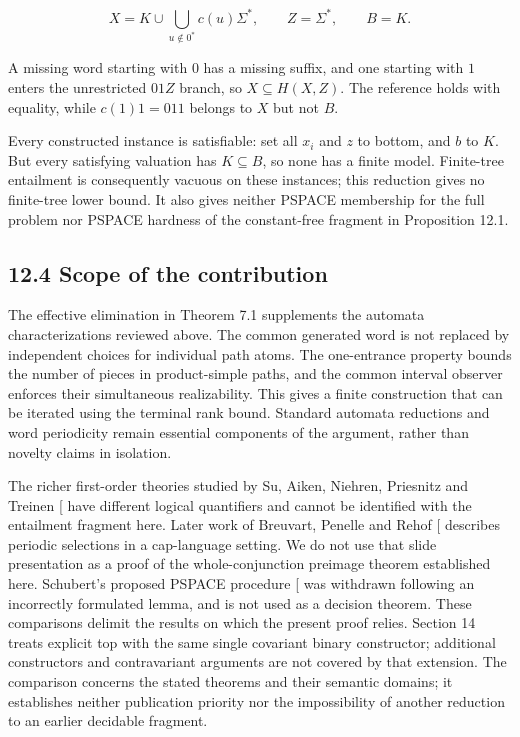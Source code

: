 \documentclass[
  11pt,
  a4paper,
]{article}
\newcounter{none} %
\begin{document}
\[X=K\cup\bigcup_{u\notin0^*}c(u)\Sigma^*,
\qquad Z=\Sigma^*,\qquad B=K.\]

A missing word starting with \(0\) has a missing suffix, and one
starting with \(1\) enters the unrestricted \(01Z\) branch, so
\(X\subseteq H(X,Z)\). The reference holds with equality, while
\(c(1)1=011\) belongs to \(X\) but not \(B\).

Every constructed instance is satisfiable: set all \(x_i\) and \(z\) to
bottom, and \(b\) to \(K\). But every satisfying valuation has
\(K\subseteq B\), so none has a finite model. Finite-tree entailment is
consequently vacuous on these instances; this reduction gives no
finite-tree lower bound. It also gives neither PSPACE membership for the
full problem nor PSPACE hardness of the constant-free fragment in
Proposition 12.1.

\subsection{12.4 Scope of the
contribution}\label{scope-of-the-contribution}

The effective elimination in Theorem 7.1 supplements the automata
characterizations reviewed above. The common generated word is not
replaced by independent choices for individual path atoms. The
one-entrance property bounds the number of pieces in product-simple
paths, and the common interval observer enforces their simultaneous
realizability. This gives a finite construction that can be iterated
using the terminal rank bound. Standard automata reductions and word
periodicity remain essential components of the argument, rather than
novelty claims in isolation.

The richer first-order theories studied by Su, Aiken, Niehren, Priesnitz
and Treinen {[}\citeproc{ref-SANPT06}{7}{]} have different logical
quantifiers and cannot be identified with the entailment fragment here.
Later work of Breuvart, Penelle and Rehof {[}\citeproc{ref-BPR19}{8}{]}
describes periodic selections in a cap-language setting. We do not use
that slide presentation as a proof of the whole-conjunction preimage
theorem established here. Schubert's proposed PSPACE procedure
{[}\citeproc{ref-Schubert21}{9}{]} was withdrawn following an
incorrectly formulated lemma, and is not used as a decision theorem.
These comparisons delimit the results on which the present proof relies.
Section 14 treats explicit top with the same single covariant binary
constructor; additional constructors and contravariant arguments are not
covered by that extension. The comparison concerns the stated theorems
and their semantic domains; it establishes neither publication priority
nor the impossibility of another reduction to an earlier decidable
fragment.
\end{document}
